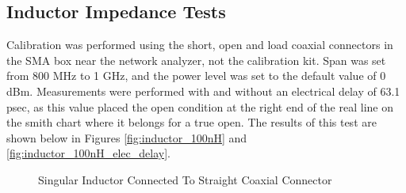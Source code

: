 \documentclass[12pt,onecolumn,titlepage]{article}
\begin{document}
\subsection{Inductor Impedance Tests}
\indent \indent Calibration was performed using the short, open and load coaxial connectors in the SMA box near the network analyzer, not the calibration kit. Span was set from 800 MHz to 1 GHz, and the power level was set to the default value of 0 dBm. Measurements were performed with and without an electrical delay of 63.1 psec, as this value placed the open condition at the right end of the real line on the smith chart where it belongs for a true open. The results of this test are shown below in Figures \ref{fig:inductor_100nH} and \ref{fig:inductor_100nH_elec_delay}.

\begin{figure}[h!]
	\centering
	\label{fig:inductor_test1}
	\caption{Singular Inductor Connected To Straight Coaxial Connector}
\end{figure}
\end{document}
